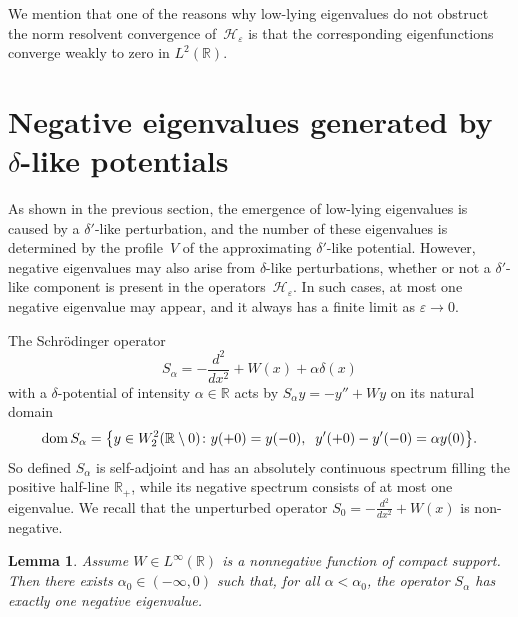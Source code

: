 \documentclass[reqno]{amsart}
\newtheorem{lem}{Lemma}
\theoremstyle{definition}
\theoremstyle{remark}
\numberwithin{equation}{section}
\newcommand{\dmn}{\mathop{\rm dom}}
\newcommand{\Real}{\mathbb R}
\newcommand{\eps}{\varepsilon}
\newcommand{\cH}{\mathcal{H}}
\begin{document}
We mention that one of the reasons why low-lying eigenvalues do not obstruct the norm resolvent convergence of~$\cH_\eps$ is that the corresponding eigenfunctions converge weakly to zero in $L^2(\Real)$.




%
\section{Negative eigenvalues generated by $\delta$-like potentials}\label{sec:deltagenerated}
%


As shown in the previous section, the emergence of low-lying eigenvalues is caused by a $\delta'$-like perturbation, and the number of these eigenvalues is determined by the profile~$V$ of the approximating $\delta'$-like potential. However, negative eigenvalues may also arise from $\delta$-like perturbations, whether or not a $\delta'$-like component is present in the operators~$\cH_\eps$. In such cases, at most one negative eigenvalue may appear, and it always has a finite limit as $\eps\to 0$.

The Schr\"odinger operator
\begin{equation*}
    S_\alpha =  -\frac{d^2}{dx^2} + W(x) + \alpha\delta(x)
\end{equation*}
with a $\delta$-potential of intensity $\alpha\in\Real$ acts by $S_\alpha y = - y'' + Wy$ on its natural domain
\begin{align*}
	\dmn S_\alpha = \big\{y\in W^2_2(\Real\setminus{0}) \colon y(+0)=y(-0),\;\; y'(+0) - y'(-0) = \alpha y(0)\big\}.
\end{align*}
So defined $S_\alpha$ is self-adjoint and has an absolutely continuous spectrum filling the positive half-line $\Real_+$, while its negative spectrum consists of at most one eigenvalue. We recall that the unperturbed operator $S_0=-\frac{d^2}{dx^2} + W(x)$ is  non-negative.

\begin{lem}\label{LemmaOnlyDelta}
Assume $W\in L^\infty(\Real)$ is a nonnegative function of compact support. Then there exists $\alpha_0\in(-\infty,0)$ such that, for all $\alpha<\alpha_0$, the operator $S_\alpha$ has exactly one negative eigenvalue.
\end{lem}
\end{document}
